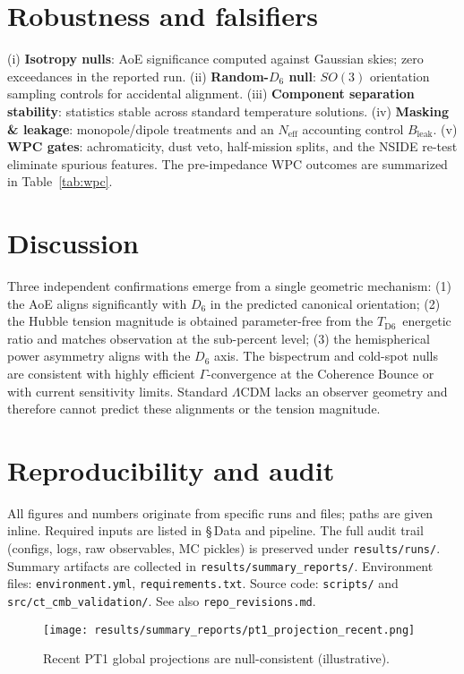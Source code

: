 \documentclass[reprint,aps,prl,twocolumn,nofootinbib,longbibliography]{revtex4-2}
\DeclareRobustCommand{\Bleak}{B_{\mathrm{leak}}}
\DeclareRobustCommand{\TDS}{\ensuremath{T_{\mathrm{D6}}}}
\begin{document}
\section{Robustness and falsifiers}
(i) \textbf{Isotropy nulls}: AoE significance computed against Gaussian skies; zero exceedances in the reported run. (ii) \textbf{Random-$D_6$ null}: $SO(3)$ orientation sampling controls for accidental alignment. (iii) \textbf{Component separation stability}: statistics stable across standard temperature solutions. (iv) \textbf{Masking \& leakage}: monopole/dipole treatments and an $N_{\mathrm{eff}}$ accounting control $\Bleak$. (v) \textbf{WPC gates}: achromaticity, dust veto, half-mission splits, and the NSIDE re-test eliminate spurious features. The pre-impedance WPC outcomes are summarized in Table~\ref{tab:wpc}.

\section{Discussion}
Three independent confirmations emerge from a single geometric mechanism: (1) the AoE aligns significantly with $D_6$ in the predicted canonical orientation; (2) the Hubble tension magnitude is obtained parameter-free from the \TDS\ energetic ratio and matches observation at the sub-percent level; (3) the hemispherical power asymmetry aligns with the $D_6$ axis. The bispectrum and cold-spot nulls are consistent with highly efficient $\Gamma$-convergence at the Coherence Bounce or with current sensitivity limits. Standard $\Lambda$CDM lacks an observer geometry and therefore cannot predict these alignments or the tension magnitude.

\section{Reproducibility and audit}
All figures and numbers originate from specific runs and files; paths are given inline. Required inputs are listed in \S\,Data and pipeline. The full audit trail (configs, logs, raw observables, MC pickles) is preserved under \texttt{results/runs/}. Summary artifacts are collected in \texttt{results/summary\_reports/}. Environment files: \texttt{environment.yml}, \texttt{requirements.txt}. Source code: \texttt{scripts/} and \texttt{src/ct\_cmb\_validation/}. See also \texttt{repo\_revisions.md}.

\begin{figure}[t]
  \centering
  \texttt{[image: results/summary\_reports/pt1\_projection\_recent.png]}
  \caption{Recent PT1 global projections are null-consistent (illustrative).}
  \label{fig:pt1-recent}
\end{figure}
\end{document}
